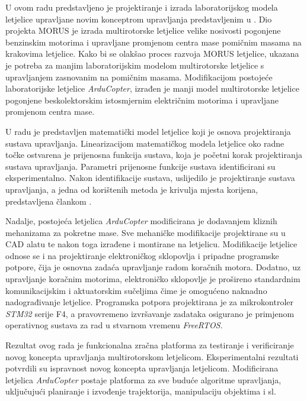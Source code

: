 \documentclass[11pt,a4paper]{article}
\begin{document}
U ovom radu predstavljeno je projektiranje i izrada laboratorijskog modela letjelice upravljane novim konceptrom upravljanja predstavljenim u \cite{haus1}. Dio projekta MORUS je izrada multirotorske letjelice velike nosivosti pogonjene benzinskim motorima i upravljane promjenom centra mase pomičnim masama na krakovima letjelice.
Kako bi se olakšao proces razvoja MORUS letjelice, ukazana je potreba za manjim laboratorijskim modelom multirotorske letjelice s upravljanjem zasnovanim na pomičnim masama. Modifikacijom postojeće laboratorijske letjelice \textit{ArduCopter},
izrađen je manji model multirotorske letjelice pogonjene beskolektorskim istosmjernim električnim motorima i upravljane promjenom centra mase.


\medskip
U radu je predstavljen matematički model letjelice koji je osnova projektiranja sustava upravljanja. Linearizacijom matematičkog modela letjelice oko radne točke ostvarena je prijenosna funkcija sustava, koja je početni korak projektiranja sustava upravljanja. Parametri prijenosne funkcije sustava identificirani su eksperimentalno. Nakon identifikacije sustava, uslijedilo je projektiranje sustava upravljanja, a jedna od korištenih metoda je krivulja mjesta korijena, predstavljena člankom \cite{haus2}.

\medskip

Nadalje, postojeća letjelica \textit{ArduCopter} modificirana je dodavanjem kliznih mehanizama za pokretne mase. Sve mehaničke modifikacije projektirane su u CAD alatu te nakon toga izrađene i montirane na letjelicu. Modifikacije letjelice odnose se i na projektiranje elektroničkog sklopovlja i pripadne programske potpore, čija je osnovna zadaća upravljanje radom koračnih motora. Dodatno, uz upravljanje koračnim motorima, elektroničko sklopovlje je prošireno standardnim komunikacijskim i aktuatorskim sučeljima čime je omogućeno naknadno nadograđivanje letjelice. Programska potpora projektirana je za mikrokontroler \textit{STM32} serije F4, a pravovremeno izvršavanje zadataka osigurano je primjenom operativnog sustava za rad u stvarnom vremenu \textit{FreeRTOS}.


\medskip
Rezultat ovog rada je funkcionalna zračna platforma za testiranje i verificiranje novog koncepta upravljanja multirotorskom letjelicom. Eksperimentalni rezultati potvrdili su ispravnost novog koncepta upravljanja letjelicom. Modificirana letjelica \textit{ArduCopter} postaje platforma za sve buduće algoritme upravljanja, uključujući planiranje i izvođenje trajektorija, manipulaciju objektima i sl.
\end{document}
